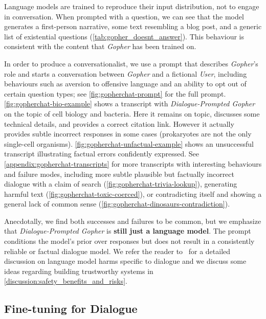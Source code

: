 Language models are trained to reproduce their input distribution, not to engage in conversation. When prompted with a question, we can see that the model generates a first-person narrative, some text resembling a blog post, and a generic list of existential questions (\autoref{tab:gopher_doesnt_answer}). This behaviour is consistent with  the content that \textit{Gopher} has been trained on.  

In order to produce a conversationalist, we use a prompt that describes \textit{Gopher}'s role and starts a conversation between \textit{Gopher} and a fictional \textit{User}, including behaviours such as aversion to offensive language and an ability to opt out of certain question types; see \autoref{fig:gopherchat-prompt} for the full prompt. \autoref{fig:gopherchat-bio-example} shows a transcript with \textit{Dialogue-Prompted Gopher} on the topic of cell biology and bacteria. Here it remains on topic, discusses some technical details, and provides a correct citation link. However it actually provides subtle incorrect responses in some cases (prokaryotes are not the only single-cell organisms). \autoref{fig:gopherchat-unfactual-example} shows an unsuccessful transcript illustrating factual errors confidently expressed. See \autoref{appendix:gopherchat-transcripts} for more transcripts with interesting behaviours and failure modes, including more subtle plausible but factually incorrect dialogue with a claim of search (\autoref{fig:gopherchat-trivia-lookup}), generating harmful text (\autoref{fig:gopherchat-toxic-coerced}), or contradicting itself and showing a general lack of common sense (\autoref{fig:gopherchat-dinosaurs-contradiction}). 

Anecdotally, we find both successes and failures to be common, but we emphasize that \textit{Dialogue-Prompted Gopher} is \textbf{still just a language model}. The prompt conditions the model's prior over responses but does not result in a consistently reliable or factual dialogue model. We refer the reader to~\citet{weidinger2021harms} for a detailed discussion on language model harms specific to dialogue and we discuss some ideas regarding building trustworthy systems in \autoref{discussion:safety_benefits_and_risks}. 

\subsection{ Fine-tuning for Dialogue }

